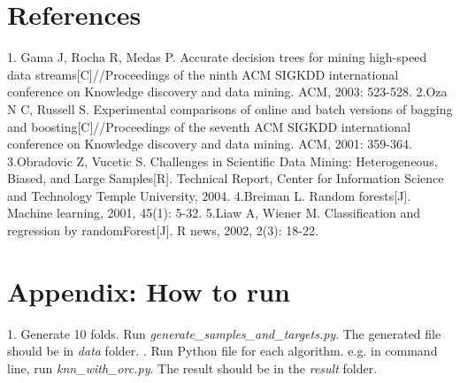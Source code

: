 \documentclass[12pt]{report}
\begin{document}
\newpage



\newpage
\section*{References}
1. Gama J, Rocha R, Medas P. Accurate decision trees for mining high-speed data streams[C]//Proceedings of the ninth ACM SIGKDD international conference on Knowledge discovery and data mining. ACM, 2003: 523-528.
\newline
\newline
2.Oza N C, Russell S. Experimental comparisons of online and batch versions of bagging and boosting[C]//Proceedings of the seventh ACM SIGKDD international conference on Knowledge discovery and data mining. ACM, 2001: 359-364.
\newline
\newline
3.Obradovic Z, Vucetic S. Challenges in Scientific Data Mining: Heterogeneous, Biased, and Large Samples[R]. Technical Report, Center for Information Science and Technology Temple University, 2004.
\newline
\newline
4.Breiman L. Random forests[J]. Machine learning, 2001, 45(1): 5-32.
\newline
\newline
5.Liaw A, Wiener M. Classification and regression by randomForest[J]. R news, 2002, 2(3): 18-22.

\newpage
\section*{Appendix: How to run}

1. Generate 10 folds. Run \textit{generate\_samples\_and\_targets.py}. The generated file should be in \textit{data} folder.
\newline
{}. Run Python file for each algorithm. e.g. in command line, run \textit{knn\_with\_orc.py}. The result should be in the \textit{result} folder.
\end{document}
